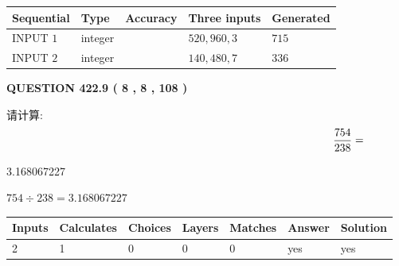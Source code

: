 \documentclass{ctexart}
\begin{document}
   
  
  
\noindent\begin{tabular}{|l|l|l|l|l|}
\hline
 Sequential & Type & Accuracy & Three inputs & Generated \\ 
\hline
 
 
  INPUT $  1 $ & integer &  & $
 520
 , 
 960
 , 
 3
 $ & $ 715 $ 
 \\  \hline  
 
 
  INPUT $  2 $ & integer &  & $
 140
 , 
 480
 , 
 7
 $ & $ 336 $ 
 \\  \hline  
 \end{tabular}
   
   
  
\vspace{0.2in}
  
{\textbf{\Large{QUESTION
422.9 
 ( 8 , 8 , 108 )
}}}
  
  
 
请计算:
\begin{equation}
\frac { %
754 }  {  %
238} = \nonumber
\end{equation}
 
 
 
\noindent{}
 
 

3.168067227
 
 
\noindent{}
 
 

 
 
 
\noindent{}
 
 

$ %
754 \div  %
238=   %
3.168067227$
 
 
\noindent{}
 
 

 
   
   
   
   
\noindent\begin{tabular}{|l|l|l|l|l|l|l|}
 \hline
Inputs & Calculates & Choices & Layers & Matches & Answer & Solution \\ \hline
 2  & 
 1  & 
 0
  & 
 0  & 
 0  & 
  yes & 
  yes 
  \\ \hline
 \end{tabular}
   
\end{document}
